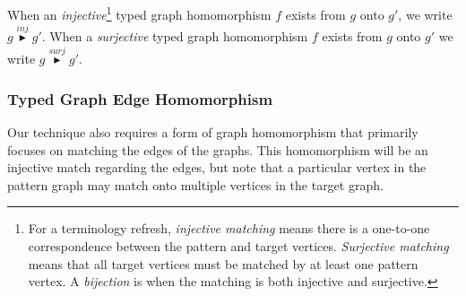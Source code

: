  When an \emph{injective}\footnote{For a terminology refresh, \textit{injective matching} means there is a one-to-one correspondence between the pattern and target vertices. \textit{Surjective matching} means that all target vertices must be matched by at least one pattern vertex. A \textit{bijection} is when the matching is both injective and surjective.} typed graph homomorphism $f$ exists from $g$ onto $g'$, we write $g \stackrel{inj}{\blacktriangleright} g'$. When a \emph{surjective} typed graph homomorphism $f$ exists from $g$ onto $g'$ we write $g \stackrel{surj}{\blacktriangleright} g'$.

\subsubsection*{Typed Graph Edge Homomorphism}

Our technique also requires a form of graph homomorphism that primarily focuses on matching the edges of the graphs. This homomorphism will be an injective match regarding the edges, but note that a particular vertex in the pattern graph may match onto multiple vertices in the target graph. 

